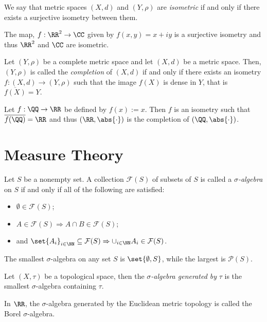 \begin{definition*}
	We say that metric spaces $(X,d)$ and $(Y,\rho)$ are \textit{isometric} if and only if there exists a surjective isometry between them.
\end{definition*}
\begin{example*}
	The map, $f:\RR^2\rightarrow\CC$ given by $f(x,y)=x+iy$ is a surjective isometry and thus $\RR^2$ and $\CC$ are isometric.
\end{example*}

\begin{definition*}
	Let $(Y,\rho)$ be a complete metric space and let $(X,d)$ be a metric space.
	Then, $(Y,\rho)$ is called the \textit{completion} of $(X,d)$ if and only if there exists an isometry $f:(X,d)\rightarrow (Y,\rho)$ such that the image $f(X)$ is dense in $Y$, that is $\overline{f(X)}=Y$.
\end{definition*}
\begin{example*}
	Let $f:\QQ\rightarrow\RR$ be defined by $f(x):=x$.
	Then $f$ is an isometry such that $\overline{f(\QQ)}=\RR$ and thus $(\RR,\abs{\cdot})$ is the completion of $(\QQ,\abs{\cdot})$.
\end{example*}


\pagebreak


\section*{Measure Theory}


\begin{definition*}
	Let $S$ be a nonempty set.
	A collection $\mathcal{F}(S)$ of subsets of $S$ is called a $\sigma$\textit{-algebra} on $S$ if and only if all of the following are satisfied:
	\begin{itemize}
		\item $\emptyset\in\mathcal{F}(S)$;
		\item $A\in\mathcal{F}(S)\Rightarrow A\cap B\in\mathcal{F}(S)$;
		\item and $\set{A_i}_{i\in\NN}\subseteq \mathcal{F}(S)\Rightarrow \cup_{i\in\NN}A_i\in\mathcal{F}(S)$.
	\end{itemize}
\end{definition*}
\begin{example*}
	The smallest $\sigma$-algebra on any set $S$ is $\set{\emptyset, S}$, while the largest is $\mathcal{P}(S)$.
\end{example*}

\begin{definition*}
	Let $(X,\tau)$ be a topological space, then the $\sigma$\textit{-algebra generated by }$\tau$ is the smallest $\sigma$-algebra containing $\tau$.
\end{definition*}
\begin{example*}
	In $\RR$, the $\sigma$-algebra generated by the Euclidean metric topology is called the Borel $\sigma$-algebra.
\end{example*}


